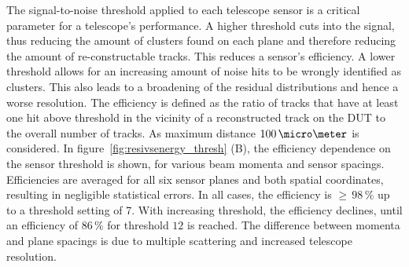 The signal-to-noise threshold applied to each telescope sensor is a critical parameter for a telescope's performance.
A higher threshold cuts into the signal, thus reducing the amount of clusters found on each plane and therefore reducing the amount of re-constructable tracks.
This reduces a sensor's efficiency.
A lower threshold allows for an increasing amount of noise hits to be wrongly identified as clusters.
This also leads to a broadening of the residual distributions and hence a worse resolution. 
The efficiency is defined as the ratio of tracks that have at least one hit above threshold in the vicinity of a reconstructed track on the DUT to the overall number of tracks.
As maximum distance $100\,\micro\meter$ is considered.
In figure~\ref{fig:resivsenergy_thresh} (B), the efficiency dependence on the sensor threshold is shown, for various beam momenta and sensor spacings.
Efficiencies are averaged for all six sensor planes and both spatial coordinates, resulting in negligible statistical errors. 
In all cases, the efficiency is $\ge\,98\,\%$ up to a threshold setting of 7.
With increasing threshold, the efficiency declines, until an efficiency of $86\,\%$ for threshold $12$ is reached.
The difference between momenta and plane spacings is due to multiple scattering and increased telescope resolution.







